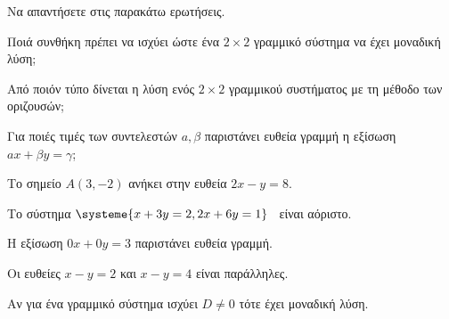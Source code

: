 \vspace{-7mm}
\begin{erwthma}
\item Να απαντήσετε στις παρακάτω ερωτήσεις.
\begin{rlist}[leftmargin=3mm]
\item Ποιά συνθήκη πρέπει να ισχύει ώστε ένα $ 2\times2 $ γραμμικό σύστημα να έχει μοναδική λύση;
\item Από ποιόν τύπο δίνεται η λύση ενός $ 2\times2 $ γραμμικού συστήματος με τη μέθοδο των οριζουσών;
\item Για ποιές τιμές των συντελεστών $ a,\beta $ παριστάνει ευθεία γραμμή η εξίσωση $ ax+\beta y=\gamma $;
\end{rlist}
\item \swstolathos
\begin{rlist}[leftmargin=3mm]
\item Το σημείο $ A(3,-2) $ ανήκει στην ευθεία $ 2x-y=8 $.
\item Το σύστημα $ \systeme{x+3y=2,2x+6y=1} $ \ είναι αόριστο.
\item Η εξίσωση $ 0x+0y=3 $ παριστάνει ευθεία γραμμή.
\item Οι ευθείες $ x-y=2 $ και $ x-y=4 $ είναι παράλληλες.
\item Αν για ένα γραμμικό σύστημα ισχύει $ D\neq0 $ τότε έχει μοναδική λύση.
\end{rlist}
\end{erwthma}